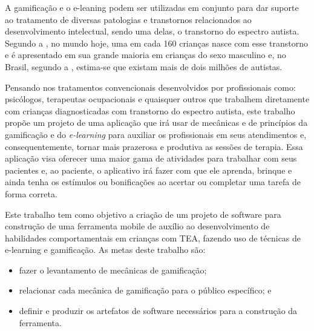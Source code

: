  A gamificação e o e-leaning podem ser utilizadas em conjunto para dar suporte ao tratamento de diversas patologias e transtornos relacionados ao desenvolvimento intelectual, sendo uma delas, o transtorno do espectro autista. Segundo a , no mundo hoje, uma em cada 160 crianças nasce com esse transtorno e é apresentado em sua grande maioria em crianças do sexo masculino e, no Brasil, segundo a , estima-se que existam mais de dois milhões de autistas.

Pensando nos tratamentos convencionais desenvolvidos por profissionais como: psicólogos, terapeutas ocupacionais e quaisquer outros que trabalhem diretamente com crianças diagnosticadas com transtorno do espectro autista, este trabalho propõe um projeto de uma aplicação que irá usar de mecânicas e de princípios da gamificação e do \textit{e-learning} para auxiliar os profissionais em seus atendimentos e, consequentemente, tornar mais prazerosa e produtiva as sessões de terapia. Essa aplicação visa oferecer uma maior gama de atividades para trabalhar com seus pacientes e, ao paciente, o aplicativo irá fazer com que ele aprenda, brinque e ainda tenha os estímulos ou bonificações ao acertar ou completar uma tarefa de forma correta.

Este trabalho tem como objetivo a criação de um projeto de software para construção de uma ferramenta mobile de auxílio ao desenvolvimento de habilidades comportamentais em crianças com TEA, fazendo uso de técnicas de e-learning e gamificação. As metas deste trabalho são:

\begin{itemize}
	\item fazer o levantamento de mecânicas de gamificação;
	
	\item relacionar cada mecânica de gamificação para o público específico; e
	
	\item definir e produzir os artefatos de software necessários para a construção da ferramenta.
\end{itemize}

